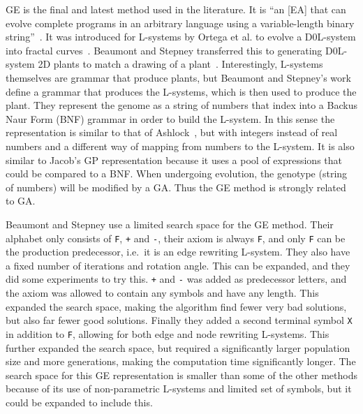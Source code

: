 \gls{GE} is the final and latest method used in the literature.
It is ``an [\gls{EA}] that can evolve complete programs in an arbitrary language using a variable-length binary string''~\cite{2003Oneil}.
It was introduced for \glspl{L-system} by Ortega et al. to evolve a D0L-system into fractal curves~\cite{2003Ortega}.
Beaumont and Stepney transferred this to generating D0L-system 2D plants to match a drawing of a plant~\cite{2009Beaumont}.
Interestingly, \glspl{L-system} themselves are grammar that produce plants, but Beaumont and Stepney's work define a grammar that produces the \glspl{L-system}, which is then used to produce the plant.
They represent the genome as a string of numbers that index into a Backus Naur Form (BNF) grammar in order to build the \gls{L-system}.
In this sense the representation is similar to that of Ashlock~\cite{2006Ashlock}, but with integers instead of real numbers and a different way of mapping from numbers to the \gls{L-system}.
It is also similar to Jacob's \gls{GP} representation because it uses a pool of expressions that could be compared to a BNF.
When undergoing evolution, the genotype (string of numbers) will be modified by a \gls{GA}.
Thus the \gls{GE} method is strongly related to \gls{GA}.

Beaumont and Stepney use a limited search space for the \gls{GE} method.
Their alphabet only consists of \texttt{F}, \texttt{+} and \texttt{-}, their axiom is always \texttt{F}, and only \texttt{F} can be the production predecessor, i.e.\ it is an edge rewriting \gls{L-system}.
They also have a fixed number of iterations and rotation angle.
This can be expanded, and they did some experiments to try this.
\texttt{+} and \texttt{-} was added as predecessor letters, and the axiom was allowed to contain any symbols and have any length.
This expanded the search space, making the algorithm find fewer very bad solutions, but also far fewer good solutions.
Finally they added a second terminal symbol \texttt{X} in addition to \texttt{F}, allowing for both edge and node rewriting \glspl{L-system}.
This further expanded the search space, but required a significantly larger population size and more generations, making the computation time significantly longer.
The search space for this \gls{GE} representation is smaller than some of the other methods because of its use of non-parametric \glspl{L-system} and limited set of symbols, but it could be expanded to include this.

